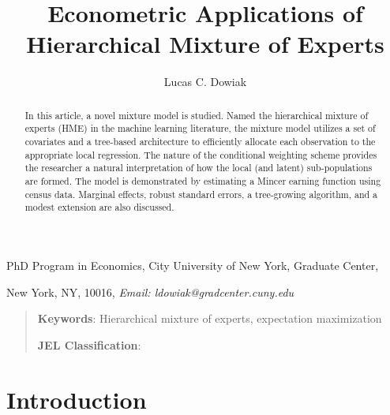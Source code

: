 \documentclass[12pt]{article}
\title{Econometric Applications of Hierarchical Mixture of Experts}
\author{Lucas C. Dowiak}
\begin{document}
 
\maketitle{}


PhD Program in Economics, City University of New York\smallskip, Graduate
Center,

New York, NY, 10016, \textit{Email: ldowiak@gradcenter.cuny.edu}

\qquad

\begin{abstract}
In this article, a novel mixture model is studied.
Named the hierarchical mixture of experts (HME) in the machine learning literature,
the mixture model utilizes a set of covariates and a tree-based architecture to
efficiently allocate each observation to the appropriate local regression.
The nature of the conditional weighting scheme provides the researcher a natural
interpretation of how the local (and latent) sub-populations are formed. The model is
demonstrated by estimating a Mincer earning function using census data. Marginal effects,
robust standard errors, a tree-growing algorithm, and a modest extension are also
discussed.

\end{abstract}

\vspace{1pt}

\begin{quotation}
\textbf{Keywords}: Hierarchical mixture of experts, expectation maximization

\textbf{JEL Classification}: 
\end{quotation}

\vspace{1pt}

\section{Introduction}
\end{document}
